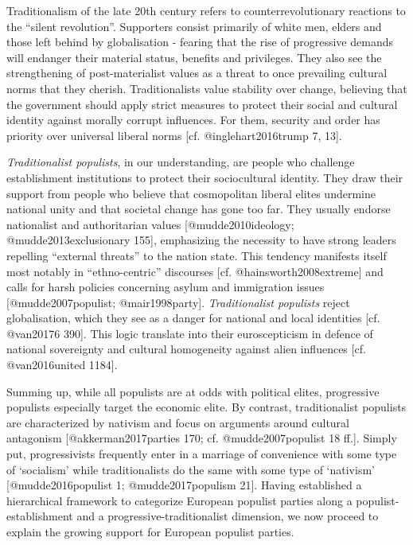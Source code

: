 \documentclass[]{article}
\begin{document}
Traditionalism of the late 20th century refers to counterrevolutionary
reactions to the ``silent revolution''. Supporters consist primarily of
white men, elders and those left behind by globalisation - fearing that
the rise of progressive demands will endanger their material status,
benefits and privileges. They also see the strengthening of
post-materialist values as a threat to once prevailing cultural norms
that they cherish. Traditionalists value stability over change,
believing that the government should apply strict measures to protect
their social and cultural identity against morally corrupt influences.
For them, security and order has priority over universal liberal norms
{[}cf. @inglehart2016trump 7, 13{]}.

\emph{Traditionalist populists}, in our understanding, are people who
challenge establishment institutions to protect their sociocultural
identity. They draw their support from people who believe that
cosmopolitan liberal elites undermine national unity and that societal
change has gone too far. They usually endorse nationalist and
authoritarian values {[}@mudde2010ideology; @mudde2013exclusionary
155{]}, emphasizing the necessity to have strong leaders repelling
``external threats'' to the nation state. This tendency manifests itself
most notably in ``ethno-centric'' discourses {[}cf.
@hainsworth2008extreme{]} and calls for harsh policies concerning asylum
and immigration issues {[}@mudde2007populist; @mair1998party{]}.
\emph{Traditionalist populists} reject globalisation, which they see as
a danger for national and local identities {[}cf. @van20176 390{]}. This
logic translate into their euroscepticism in defence of national
sovereignty and cultural homogeneity against alien influences {[}cf.
@van2016united 1184{]}.

Summing up, while all populists are at odds with political elites,
progressive populists especially target the economic elite. By contrast,
traditionalist populists are characterized by nativism and focus on
arguments around cultural antagonism {[}@akkerman2017parties 170; cf.
@mudde2007populist 18 ff.{]}. Simply put, progressivists frequently
enter in a marriage of convenience with some type of `socialism' while
traditionalists do the same with some type of `nativism'
{[}@mudde2016populist 1; @mudde2017populism 21{]}. Having established a
hierarchical framework to categorize European populist parties along a
populist-establishment and a progressive-traditionalist dimension, we
now proceed to explain the growing support for European populist
parties.
\end{document}
